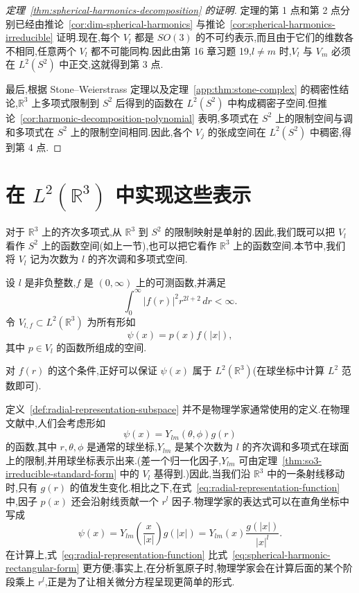\begin{proof}[定理~\ref{thm:spherical-harmonics-decomposition} 的证明]
定理的第 1 点和第 2 点分别已经由推论~\ref{cor:dim-spherical-harmonics} 与推论~\ref{cor:spherical-harmonics-irreducible} 证明.现在,每个 $V_l$ 都是 $SO(3)$ 的不可约表示,而且由于它们的维数各不相同,任意两个 $V_l$ 都不可能同构.因此由第 16 章习题 19,$l\neq m$ 时,$V_l$ 与 $V_m$ 必须在 $L^2(S^2)$ 中正交,这就得到第 3 点.

最后,根据 Stone--Weierstrass 定理以及定理~\ref{app:thm:stone-complex} 的稠密性结论,$\mathbb R^3$ 上多项式限制到 $S^2$ 后得到的函数在 $L^2(S^2)$ 中构成稠密子空间.但推论~\ref{cor:harmonic-decomposition-polynomial} 表明,多项式在 $S^2$ 上的限制空间与调和多项式在 $S^2$ 上的限制空间相同.因此,各个 $V_j$ 的张成空间在 $L^2(S^2)$ 中稠密,得到第 4 点.
\end{proof}

\section{在 $L^2(\mathbb R^3)$ 中实现这些表示}
\label{sec:representations-in-l2-r3}

对于 $\mathbb R^3$ 上的齐次多项式,从 $\mathbb R^3$ 到 $S^2$ 的限制映射是单射的.因此,我们既可以把 $V_l$ 看作 $S^2$ 上的函数空间(如上一节),也可以把它看作 $\mathbb R^3$ 上的函数空间.本节中,我们将 $V_l$ 记为次数为 $l$ 的齐次调和多项式空间.

\begin{definition}[径向因子产生的表示空间]\label{def:radial-representation-subspace}
设 $l$ 是非负整数,$f$ 是 $(0,\infty)$ 上的可测函数,并满足
\[
 \int_0^\infty |f(r)|^2r^{2l+2}\,dr<\infty.
\label{eq:radial-factor-integrability}
\]
令 $V_{l,f}\subset L^2(\mathbb R^3)$ 为所有形如
\[
 \psi(x)=p(x)f(|x|),
\label{eq:radial-representation-function}
\]
其中 $p\in V_l$ 的函数所组成的空间.
\end{definition}

对 $f(r)$ 的这个条件,正好可以保证 $\psi(x)$ 属于 $L^2(\mathbb R^3)$(在球坐标中计算 $L^2$ 范数即可).

定义~\ref{def:radial-representation-subspace} 并不是物理学家通常使用的定义.在物理文献中,人们会考虑形如
\[
 \psi(x)=Y_{lm}(\theta,\phi)g(r)
\label{eq:spherical-harmonic-radial-form}
\]
的函数,其中 $r,\theta,\phi$ 是通常的球坐标,$Y_{lm}$ 是某个次数为 $l$ 的齐次调和多项式在球面上的限制,并用球坐标表示出来.(差一个归一化因子,$Y_{lm}$ 可由定理~\ref{thm:so3-irreducible-standard-form} 中的 $V_l$ 基得到.)因此,当我们沿 $\mathbb R^3$ 中的一条射线移动时,只有 $g(r)$ 的值发生变化.相比之下,在式~\eqref{eq:radial-representation-function} 中,因子 $p(x)$ 还会沿射线贡献一个 $r^l$ 因子.物理学家的表达式可以在直角坐标中写成
\[
 \psi(x)=Y_{lm}\left(\frac{x}{|x|}\right)g(|x|)
 =Y_{lm}(x)\frac{g(|x|)}{|x|^l}.
\label{eq:spherical-harmonic-rectangular-form}
\]
在计算上,式~\eqref{eq:radial-representation-function} 比式~\eqref{eq:spherical-harmonic-rectangular-form} 更方便;事实上,在分析氢原子时,物理学家会在计算后面的某个阶段乘上 $r^l$,正是为了让相关微分方程呈现更简单的形式.

